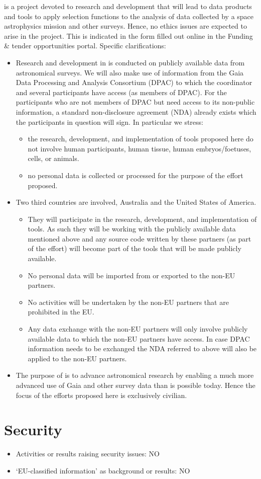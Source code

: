 {\acro} is a project devoted to research and development that will lead to data products and tools to apply selection functions to the analysis of data collected by a space astrophysics mission and other surveys. Hence, no ethics issues are expected to arise in the project. This is indicated in the form filled out online in the Funding \& tender opportunities portal. Specific clarifications:
\begin{itemize}
    \item Research and development in {\acro} is conducted on publicly available data from astronomical surveys. We will also make use of information from the Gaia Data Processing and Analysis Consortium (DPAC) to which the coordinator and several participants have access (as members of DPAC). For the participants who are not members of DPAC but need access to its non-public information, a standard non-disclosure agreement (NDA) already exists which the participants in question will sign. In particular we stress:
    \begin{itemize}
        \item the research, development, and implementation of tools proposed here do not involve human participants, human tissue, human embryos/foetuses, cells, or animals.
        \item no personal data is collected or processed for the purpose of the effort proposed.
    \end{itemize}
    \item Two third countries are involved, Australia and the United States of America.
    \begin{itemize}
        \item They will participate in the {\acro} research, development, and implementation of tools. As such they will be working with the publicly available data mentioned above and any source code written by these partners (as part of the {\acro} effort) will become part of the {\acro} tools that will be made publicly available.
        \item No personal data will be imported from or exported to the non-EU partners.
        \item No activities will be undertaken by the non-EU partners that are prohibited in the EU.
        \item Any data exchange with the non-EU partners will only involve publicly available data to which the non-EU partners have access. In case DPAC information needs to be exchanged the NDA referred to above will also be applied to the non-EU partners.
    \end{itemize}
    \item The purpose of {\acro} is to advance astronomical research by enabling a much more advanced use of Gaia and other survey data than is possible today. Hence the focus of the efforts proposed here is exclusively civilian.
\end{itemize}

\section{Security}
\label{sec:security}
\begin{itemize}
\item Activities or results raising security issues: NO
\item `EU-classified information' as background or results: NO
\end{itemize}

